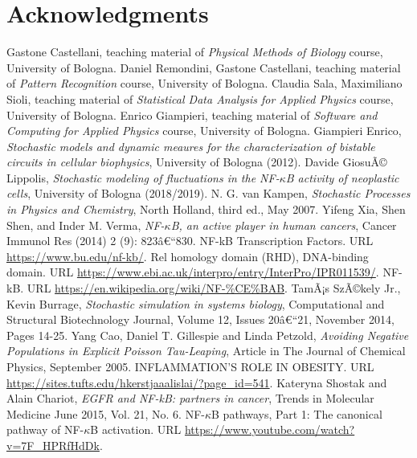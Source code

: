 \documentclass[12pt,a4paper]{report}
\begin{document}
\chapter*{Acknowledgments}

\begin{thebibliography}{bibliography}
      Gastone Castellani, teaching material of {\em Physical Methods of Biology} course, University of Bologna.
     Daniel Remondini, Gastone Castellani, teaching material of {\em Pattern Recognition} course, University of Bologna.
     Claudia Sala, Maximiliano Sioli, teaching material of {\em Statistical Data Analysis for Applied Physics} course, University of Bologna.
     Enrico Giampieri, teaching material of {\em Software and Computing for Applied Physics} course, University of Bologna.
     Giampieri Enrico, {\em Stochastic models and dynamic meaures for the characterization of bistable circuits in cellular biophysics}, University of Bologna (2012).
     Davide GiosuÃ© Lippolis, {\em Stochastic modeling of fluctuations in the NF-$\kappa$B activity of neoplastic cells}, University of Bologna (2018/2019).
     N. G. van Kampen, {\em Stochastic Processes in Physics and Chemistry}, North Holland, third ed., May 2007.
     Yifeng Xia, Shen Shen, and Inder M. Verma, {\em NF-$\kappa$B, an active player in human cancers}, Cancer Immunol Res (2014) 2 (9): 823â€“830.
     NF-kB Transcription Factors. URL \url{https://www.bu.edu/nf-kb/}.
     Rel homology domain (RHD), DNA-binding domain. URL \url{https://www.ebi.ac.uk/interpro/entry/InterPro/IPR011539/}.
	 NF-kB. URL \url{https://en.wikipedia.org/wiki/NF-%CE%BAB}.
     TamÃ¡s SzÃ©kely Jr., Kevin Burrage, {\em Stochastic simulation in systems biology}, Computational and Structural Biotechnology Journal, Volume 12, Issues 20â€“21, November 2014, Pages 14-25.
     Yang Cao, Daniel T. Gillespie and Linda Petzold, {\em Avoiding Negative Populations in Explicit Poisson Tau-Leaping}, Article  in  The Journal of Chemical Physics, September 2005.
     INFLAMMATION'S ROLE IN OBESITY. URL \url{https://sites.tufts.edu/hkerstjaaalislai/?page_id=541}.
     Kateryna Shostak and Alain Chariot, {\em EGFR and NF-kB: partners in cancer}, Trends in Molecular Medicine June 2015, Vol. 21, No. 6.
     NF-$\kappa$B pathways, Part 1: The canonical pathway of NF-$\kappa$B activation. URL \url{https://www.youtube.com/watch?v=7F_HPRfHdDk}.

\end{thebibliography}
\end{document}

